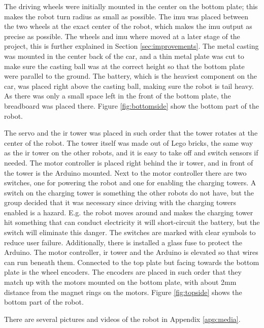 The driving wheels were initially mounted in the center on the bottom plate; this makes the robot turn radius as small as possible. The \acrshort{imu} was placed between the two wheels at the exact center of the robot, which makes the \acrshort{imu} output as precise as possible. The wheels and \acrshort{imu} where moved at a later stage of the project, this is further explained in Section \ref{sec:improvements}. The metal casting was mounted in the center back of the car, and a thin metal plate was cut to make sure the casting ball was at the correct height so that the bottom plate were parallel to the ground. The battery, which is the heaviest component on the car, was placed right above the casting ball, making sure the robot is tail heavy. As there was only a small space left in the front of the bottom plate, the breadboard was placed there. Figure \ref{fig:bottomside} show the bottom part of the robot.

The servo and the \acrshort{ir} tower was placed in such order that the tower rotates at the center of the robot. The tower itself was made out of Lego bricks, the same way as the \acrshort{ir} tower on the other robots, and it is easy to take off and switch sensors if needed. The motor controller is placed right behind the \acrshort{ir} tower, and in front of the tower is the Arduino mounted. Next to the motor controller there are two switches, one for powering the robot and one for enabling the charging towers. A switch on the charging tower is something the other robots do not have, but the group decided that it was necessary since driving with the charging towers enabled is a hazard. E.g. the robot moves around and makes the charging tower hit something that can conduct electricity it will short-circuit the battery, but the switch will eliminate this danger. The switches are marked with clear symbols to reduce user failure. Additionally, there is installed a glass fuse to protect the Arduino. The motor controller, \acrshort{ir} tower and the Arduino is elevated so that wires can run beneath them. Connected to the top plate but facing towards the bottom plate is the wheel encoders. The encoders are placed in such order that they match up with the motors mounted on the bottom plate, with about 2mm distance from the magnet rings on the motors. Figure \ref{fig:topside} shows the bottom part of the robot.

There are several pictures and videos of the robot in Appendix \ref{app:media}.


